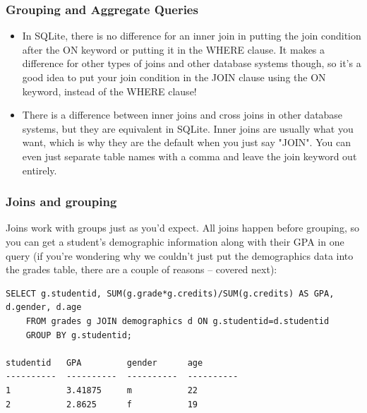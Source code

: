 \begin{frame}[fragile] \frametitle{Grouping and Aggregate Queries}
\begin{itemize}
\item In SQLite, there is no difference for an inner join in putting the join condition after the ON keyword or putting it in the WHERE clause. It makes a difference for other types of joins and other database systems though, so it's a good idea to put your join condition in the JOIN clause using the ON keyword, instead of the WHERE clause!

\item There is a difference between inner joins and cross joins in other database systems, but they are equivalent in SQLite. Inner joins are usually what you want, which is why they are the default when you just say "JOIN". You can even just separate table names with a comma and leave the join keyword out entirely.
\end{itemize}
\end{frame}

\begin{frame}[fragile] \frametitle{Joins and grouping}
Joins work with groups just as you'd expect. All joins happen before grouping, so you can get a
student's demographic information along with their GPA in one query (if you're wondering why we
couldn't just put the demographics data into the grades table, there are a couple of reasons --
covered next):
\begin{lstlisting}
SELECT g.studentid, SUM(g.grade*g.credits)/SUM(g.credits) AS GPA, d.gender, d.age
    FROM grades g JOIN demographics d ON g.studentid=d.studentid
    GROUP BY g.studentid;

studentid   GPA         gender      age
----------  ----------  ----------  ----------
1           3.41875     m           22
2           2.8625      f           19
\end{lstlisting}
\end{frame}

